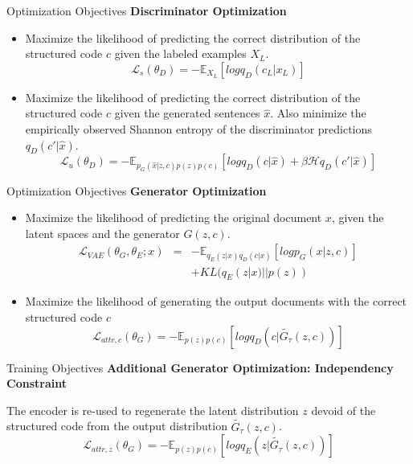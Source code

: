 \documentclass{beamer}
\begin{document}
\begin{frame}{Optimization Objectives}
  \textbf{Discriminator Optimization}

  \begin{itemize}
    \item Maximize the likelihood of predicting the correct distribution of the structured code $c$ given the labeled examples $X_L$.
    \begin{equation*}
      \mathcal{L}_s(\theta_D) = - \mathbb{E}_{X_L}[log q_D(c_L|x_L)]
    \end{equation*}
    \item Maximize the likelihood of predicting the correct distribution of the structured code $c$ given the generated sentences $\hat{x}$. Also minimize the empirically observed Shannon entropy of the discriminator predictions $q_D(c'|\hat{x})$.
    \begin{equation*}
      \mathcal{L}_u(\theta_D) = - \mathbb{E}_{p_G(\hat{x}|z,c)p(z)p(c)}
      [log q_D(c|\hat{x}) + \beta \mathcal{H} q_D(c'|\hat{x})]
    \end{equation*}
  \end{itemize}
\end{frame}

\begin{frame}{Optimization Objectives}
  \textbf{Generator Optimization}

  \begin{itemize}
    \item Maximize the likelihood of predicting the original document $x$, given the latent spaces and the generator $G(z,c)$.
      \begin{eqnarray*}
        \mathcal{L}_{VAE}(\theta_G, \theta_E; x) &=&
        - \mathbb{E}_{q_E(z|x)q_D(c|x)}[log p_G(x|z,c)] \\ & &
        + KL(q_E(z|x)||p(z))
      \end{eqnarray*}
    \item Maximize the likelihood of generating the output documents with the correct structured code $c$
    \begin{equation*}
      \mathcal{L}_{attr, c}(\theta_G) = - \mathbb{E}_{p(z)p(c)}
      [log q_D(c|\tilde{G_{\tau}}(z,c))]
    \end{equation*}
  \end{itemize}
\end{frame}

\begin{frame}{Training Objectives}
  \textbf{Additional Generator Optimization: Independency Constraint}

  The encoder is re-used to regenerate the latent distribution $z$ devoid of the structured code from the output distribution $\tilde{G_{\tau}}(z,c)$.
  \begin{equation*}
    \mathcal{L}_{attr, z}(\theta_G) = - \mathbb{E}_{p(z)p(c)}
    [log q_E(z|\tilde{G_{\tau}}(z,c))]
  \end{equation*}
\end{frame}
\end{document}
